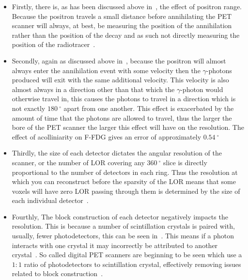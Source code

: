                 \begin{itemize}
                    \item Firstly, there is, as has been discussed above in~, the effect of positron range. Because the positron travels a small distance before annihilating the \gls{PET} scanner will always, at best, be measuring the position of the annihilation rather than the position of the decay and as such not directly measuring the position of the radiotracer~.
                    
                    \item Secondly, again as discussed above in~, because the positron will almost always enter the annihilation event with some velocity then the $\gamma$-photons produced will exit with the same additional velocity. This velocity is also almost always in a direction other than that which the $\gamma$-photon would otherwise travel in, this causes the photons to travel in a direction which is not exactly $\SI{180}{^{\circ}}$ apart from one another. This effect is exacerbated by the amount of time that the photons are allowed to travel, thus the larger the bore of the \gls{PET} scanner the larger this effect will have on the resolution. The effect of acolliniarity on \gls{F-FDG} gives an error of approximately $\SI{0.54}{^{\circ}}$~
                    
                    \item Thirdly, the size of each detector dictates the angular resolution of the scanner, or the number of \gls{LOR} covering any $\SI{360}{^{\circ}}$ slice is directly proportional to the number of detectors in each ring. Thus the resolution at which you can reconstruct before the sparsity of the \gls{LOR} means that some voxels will have zero \gls{LOR} passing through them is determined by the size of each individual detector~.
                    
                    \item Fourthly, The block construction of each detector negatively impacts the resolution. This is because a number of scintillation crystals is paired with, usually, fewer photodetectors, this can be seen in~. This means if a photon interacts with one crystal it may incorrectly be attributed to another crystal~. So called digital \gls{PET} scanners are beginning to be seen which use a $1:1$ ratio of photodetectors to scintillation crystal, effectively removing issues related to block construction~.
                    

\end{itemize}
